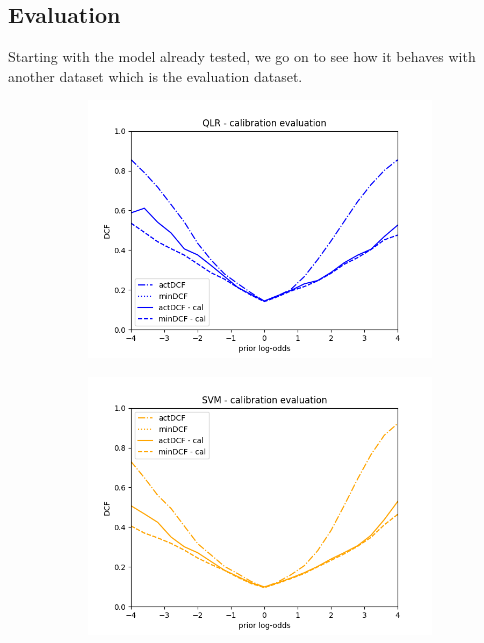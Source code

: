 
\subsection{Evaluation}
\label{subsec:evaluation}

Starting with the model already tested, we go on to see how it behaves with another dataset which is the evaluation dataset.

\begin{figure}[h!]
    \centering
    \begin{subfigure}[b]{0.40\linewidth}
        \includegraphics[width=\linewidth]{Lab/11. Lab 11/Images/Evaluation/01. QLR}
        \label{fig:QLREvaluation}
    \end{subfigure}
    \begin{subfigure}[b]{0.40\linewidth}
        \includegraphics[width=\linewidth]{Lab/11. Lab 11/Images/Evaluation/02. SVM}

\end{subfigure}
\end{figure}
